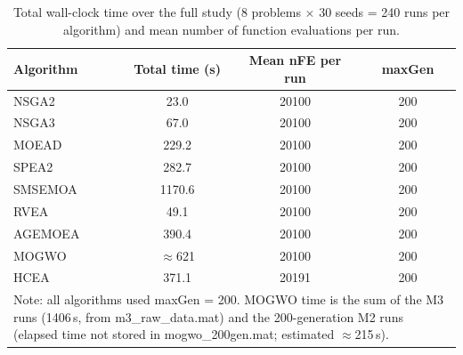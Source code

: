\begin{table}[t]
\centering
\caption{Total wall-clock time over the full study (8 problems $\times$ 30 seeds = 240 runs per algorithm) and mean number of function evaluations per run.}
\label{tab:runtime}
\begin{tabular}{lccc}
\toprule
Algorithm & Total time (s) & Mean nFE per run & maxGen \\
\midrule
NSGA2 & 23.0 & 20100 & 200 \\
NSGA3 & 67.0 & 20100 & 200 \\
MOEAD & 229.2 & 20100 & 200 \\
SPEA2 & 282.7 & 20100 & 200 \\
SMSEMOA & 1170.6 & 20100 & 200 \\
RVEA & 49.1 & 20100 & 200 \\
AGEMOEA & 390.4 & 20100 & 200 \\
MOGWO & $\approx$621 & 20100 & 200 \\
HCEA & 371.1 & 20191 & 200 \\
\midrule
\multicolumn{4}{l}{\footnotesize Note: all algorithms used maxGen = 200. MOGWO time is the sum of the M3 runs (1406\,s, from m3\_raw\_data.mat) and the 200-generation M2 runs (elapsed time not stored in mogwo\_200gen.mat; estimated $\approx$215\,s).}\\
\bottomrule
\end{tabular}
\end{table}
